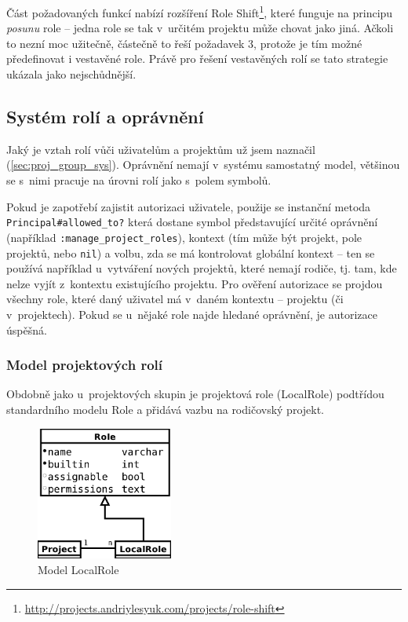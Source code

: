 \documentclass[thesis=B,czech]{FITthesis}[2012/05/02]
\begin{document}
Část požadovaných funkcí nabízí rozšíření Role Shift\footnote{\url{http://projects.andriylesyuk.com/projects/role-shift}},
které funguje na principu \emph{posunu} role -- jedna role se tak
v~určitém projektu může chovat jako jiná. Ačkoli to nezní moc užitečně,
částečně to řeší požadavek 3, protože je tím možné předefinovat i vestavěné
role. Právě pro řešení vestavěných rolí se tato strategie ukázala jako
nejschůdnější.

\subsection{Systém rolí a oprávnění}

Jaký je vztah rolí vůči uživatelům a projektům už jsem naznačil
(\ref{sec:proj_group_sys}). Oprávnění nemají v~systému samostatný model,
většinou se s~nimi pracuje na úrovni rolí jako s~polem symbolů.

Pokud je zapotřebí zajistit autorizaci uživatele, použije se instanční
metoda \lstinline!Principal#allowed_to?! která dostane symbol
představující určité oprávnění (například
\lstinline!:manage_project_roles!), kontext (tím může být projekt, pole
projektů, nebo \lstinline!nil!) a volbu, zda se má kontrolovat globální
kontext -- ten se používá například u~vytváření nových projektů, které
nemají rodiče, tj. tam, kde nelze vyjít z~kontextu existujícího
projektu. Pro ověření autorizace se projdou všechny role, které daný
uživatel má v~daném kontextu -- projektu (či v~projektech). Pokud se
u~nějaké role najde hledané oprávnění, je autorizace úspěšná.

\subsubsection{Model projektových rolí}

Obdobně jako u~projektových skupin je projektová role (LocalRole)
podtřídou standardního modelu Role a přidává vazbu na rodičovský
projekt.

\begin{figure}[htbp]
\centering
\includegraphics[width=0.4\textwidth]{role-er1.pdf}
\caption{Model LocalRole}
\end{figure}
\end{document}
